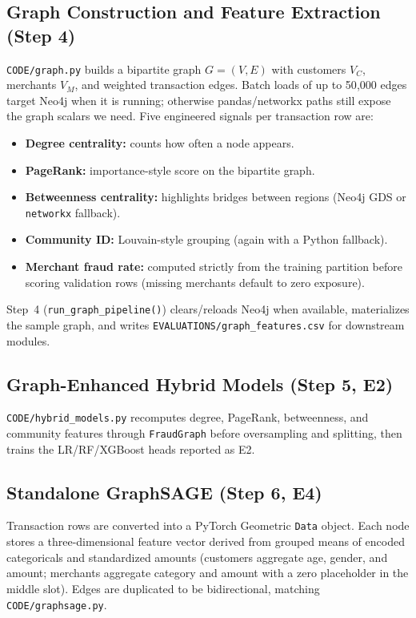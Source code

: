 \documentclass[conference]{IEEEtran}
\begin{document}
\subsection{Graph Construction and Feature Extraction (Step 4)}

\texttt{CODE/graph.py} builds a bipartite graph $G=(V,E)$ with customers $V_C$, merchants $V_M$, and weighted transaction edges. Batch loads of up to 50{,}000 edges target Neo4j when it is running; otherwise pandas/networkx paths still expose the graph scalars we need. Five engineered signals per transaction row are:

\begin{itemize}
    \item \textbf{Degree centrality:} counts how often a node appears.
    \item \textbf{PageRank:} importance-style score on the bipartite graph.
    \item \textbf{Betweenness centrality:} highlights bridges between regions (Neo4j GDS or \texttt{networkx} fallback).
    \item \textbf{Community ID:} Louvain-style grouping (again with a Python fallback).
    \item \textbf{Merchant fraud rate:} computed strictly from the training partition before scoring validation rows (missing merchants default to zero exposure).
\end{itemize}

Step~4 (\texttt{run\_graph\_pipeline()}) clears/reloads Neo4j when available, materializes the sample graph, and writes \texttt{EVALUATIONS/graph\_features.csv} for downstream modules.

\subsection{Graph-Enhanced Hybrid Models (Step 5, E2)}

\texttt{CODE/hybrid\_models.py} recomputes degree, PageRank, betweenness, and community features through \texttt{FraudGraph} before oversampling and splitting, then trains the LR/RF/XGBoost heads reported as E2.

\subsection{Standalone GraphSAGE (Step 6, E4)}

Transaction rows are converted into a PyTorch Geometric \texttt{Data} object. Each node stores a three-dimensional feature vector derived from grouped means of encoded categoricals and standardized amounts (customers aggregate age, gender, and amount; merchants aggregate category and amount with a zero placeholder in the middle slot). Edges are duplicated to be bidirectional, matching \texttt{CODE/graphsage.py}.
\end{document}
